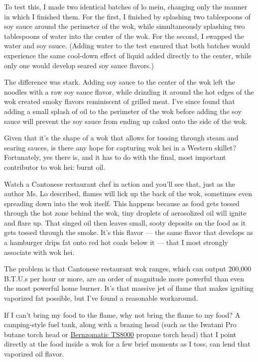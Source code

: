 To test this, I made two identical batches of lo mein, changing only the
manner in which I finished them. For the first, I finished by splashing
two tablespoons of soy sauce around the perimeter of the wok, while
simultaneously splashing two tablespoons of water into the center of the
wok. For the second, I swapped the water and soy sauce. (Adding water to
the test ensured that both batches would experience the same cool-down
effect of liquid added directly to the center, while only one would
develop seared soy sauce flavors.)

The difference was stark. Adding soy sauce to the center of the wok left
the noodles with a raw soy sauce flavor, while drizzling it around the
hot edges of the wok created smoky flavors reminiscent of grilled meat.
I've since found that adding a small splash of oil to the perimeter of
the wok before adding the soy sauce will prevent the soy sauce from
ending up caked onto the side of the wok.

Given that it's the shape of a wok that allows for tossing through steam
and searing sauces, is there any hope for capturing wok hei in a Western
skillet? Fortunately, yes there is, and it has to do with the final,
most important contributor to wok hei: burnt oil.

Watch a Cantonese restaurant chef in action and you'll see that, just as
the author Ms. Lo described, flames will lick up the back of the wok,
sometimes even spreading down into the wok itself. This happens because
as food gets tossed through the hot zone behind the wok, tiny droplets
of aerosolized oil will ignite and flare up. That singed oil then leaves
small, sooty deposits on the food as it gets tossed through the smoke.
It's this flavor --- the same flavor that develops as a hamburger drips
fat onto red hot coals below it --- that I most strongly associate with
wok hei.

The problem is that Cantonese restaurant wok ranges, which can output
200,000 B.T.U.s per hour or more, are an order of magnitude more
powerful than even the most powerful home burner. It's that massive jet
of flame that makes igniting vaporized fat possible, but I've found a
reasonable workaround.

If I can't bring my food to the flame, why not bring the flame to my
food? A camping-style fuel tank, along with a brazing head (such as the
Iwatani Pro butane torch head or
\href{https://www.bernzomatic.com/Products/Hand-Torches/Instant-On-Off/TS8000}{Bernzomatic
TS8000} propane torch head) that I point directly at the food inside a
wok for a few brief moments as I toss, can lend that vaporized oil
flavor.

